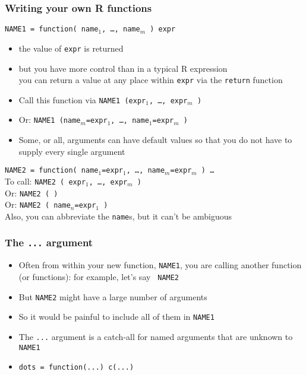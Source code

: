 \documentclass[11pt,pdftex,dvipsnames,usenames,helvetica]{beamer}
\begin{document}
\begin{frame}
\frametitle{Writing your own R functions }

{\tt NAME1 = function( name$_1$, \dots, name$_m$ ) expr } 
\begin{itemize}
\item the value of {\tt expr} is returned
\item but you have more control than in a typical R expression\\
you can return a value at any place within {\tt expr}
via the {\tt return} function
\item Call this function via {\tt NAME1 (expr$_1$, \dots, expr$_m$ )}
\item Or: {\tt NAME1 (name$_m$=expr$_1$, \dots, name$_1$=expr$_m$ )}
\item Some, or all, arguments can have default values so that you do not 
have to supply every single argument
\end{itemize}
{\tt NAME2 = function( name$_1$=expr$_1$, \dots, name$_m$=expr$_{m}$ ) \dots } \\
To call: {\tt NAME2 ( expr$_1$, \dots, expr$_m$ )  } \\
Or: {\tt NAME2 ( )  } \\
Or: {\tt NAME2 ( name$_n$=expr$_1$ )  } \\
Also, you can abbreviate the {\tt name}s, but it can't be ambiguous
\end{frame}

\begin{frame}
\frametitle{The {\tt ...} argument}

\begin{itemize}
\item Often from within your new function, {\tt NAME1}, you are
  calling another function (or functions): for example, let's say {\tt
    NAME2}
\item But {\tt NAME2} might have a large number of arguments
\item So it would be painful to include all of them in {\tt NAME1}
\item The {\tt ...} argument is a catch-all for named arguments
that are unknown to {\tt NAME1}
\item {\tt dots = function(...) c(...)}
\end{itemize}
\end{frame}
\end{document}
